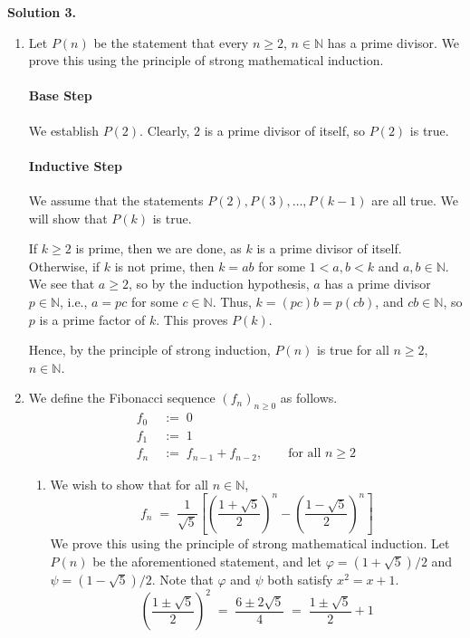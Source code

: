 \documentclass[10pt]{article}
\begin{document}
        \clearpage
        \textbf{Solution 3.}
        \begin{enumerate}
                \item Let $P(n)$ be the statement that every $n \geq 2$, $n \in \mathbb{N}$ has a prime divisor.
                We prove this using the principle of strong mathematical induction.
                \paragraph{Base Step}
                We establish $P(2)$. Clearly, $2$ is a prime divisor of itself, so $P(2)$ is true.
                \paragraph{Inductive Step}
                We assume that the statements $P(2), P(3), \dots, P(k-1)$ are all true. We will show that $P(k)$ is true.

                If $k \geq 2$ is prime, then we are done, as $k$ is a prime divisor of itself. Otherwise, if
                $k$ is not prime, then $k = ab$ for some $1 < a, b < k$ and $a, b \in \mathbb{N}$. We see that $a \geq 2$,
                so by the induction hypothesis, $a$ has a prime divisor $p \in \mathbb{N}$, i.e.,  $a = pc$ for some $c \in \mathbb{N}$.
                Thus, $k = (pc)b = p(cb)$, and $cb \in \mathbb{N}$, so $p$ is a prime factor of $k$. This proves $P(k)$.

                Hence, by the principle of strong induction, $P(n)$ is true for all $n \geq 2$, $n \in \mathbb{N}$.
                
                \item We define the Fibonacci sequence $(f_n)_{n\geq 0}$ as follows.
                \begin{align*}
                        f_0 \;&:=\; 0 \\
                        f_1 \;&:=\; 1 \\
                        f_n \;&:=\; f_{n - 1} + f_{n - 2}, \quad\quad\text{for all }n \geq 2
                \end{align*}
                \begin{enumerate}
                        \item We wish to show that for all $n \in \mathbb{N}$,
                        \[f_n \;=\; \frac{1}{\sqrt{5}}\left[ \left(\frac{1 + \sqrt{5}}{2}\right)^{\!\!n} - \left(\frac{1 - \sqrt{5}}{2}\right)^{\!\!n} \right] 
                        \tag{Binet's formula} \]
                        We prove this using the principle of strong mathematical induction.
                        Let $P(n)$ be the aforementioned statement, and let $\varphi = (1 + \sqrt{5})/2$ and $\psi = (1 - \sqrt{5})/2$.
                        Note that $\varphi$ and $\psi$ both satisfy $x^2 = x + 1$.
                        \[
                        \left(\frac{1 \pm \sqrt{5}}{2}\right)^2 \;=\; \frac{6 \pm 2\sqrt{5}}{4} \;=\; \frac{1 \pm \sqrt{5}}{2} + 1
                        \]

\end{enumerate}
\end{enumerate}
\end{document}
